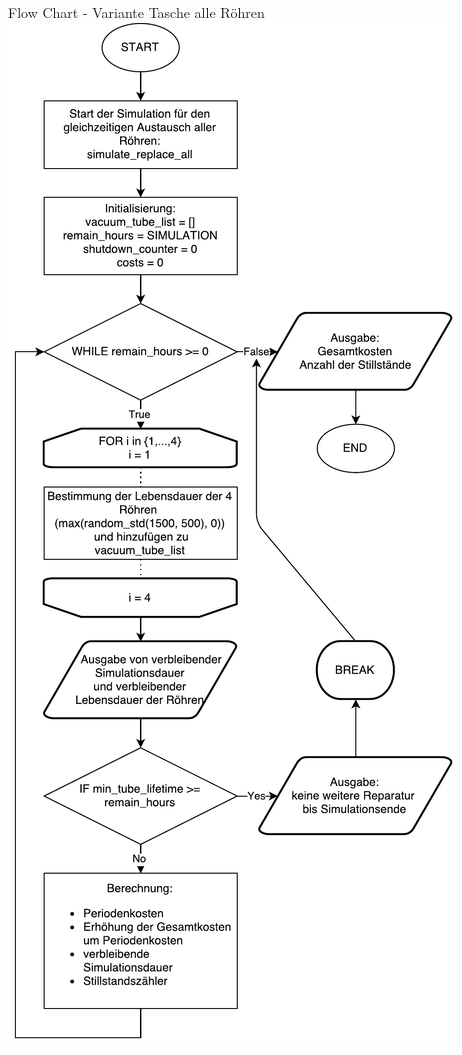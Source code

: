 \begin{frame}{Flow Chart - Variante Tasche alle Röhren}
	\centering
  	\includegraphics[scale=0.2]{BSP20_Flow_Chart_all.pdf}
\end{frame}

